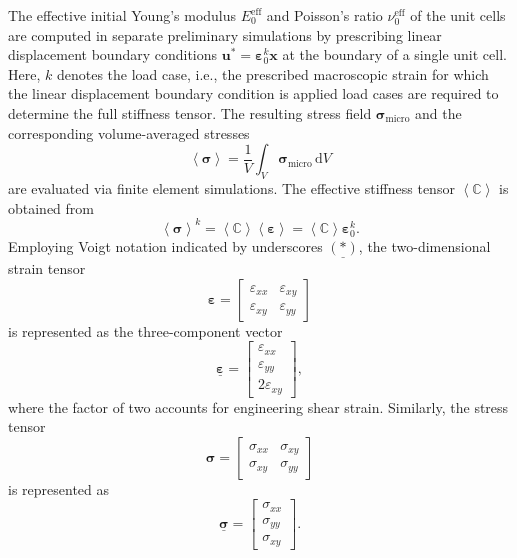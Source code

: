 \documentclass[pdflatex,sn-mathphys-num]{sn-jnl}%
\theoremstyle{thmstyleone}%
\theoremstyle{thmstyletwo}%
\theoremstyle{thmstylethree}%
\begin{document}
The effective initial Young’s modulus $E_0^{\text{eff}}$ and Poisson’s ratio $\nu_0^{\text{eff}}$ of the unit cells are computed in separate preliminary simulations by prescribing linear displacement boundary conditions $\boldsymbol{u}^* = \boldsymbol{\varepsilon}_0^k \boldsymbol{x}$ at the boundary of a single unit cell.
Here, $k$ denotes the load case, i.e., the prescribed macroscopic strain for which the linear displacement boundary condition is applied load cases are required to determine the full stiffness tensor.
The resulting stress field $\boldsymbol{\sigma}_{\text{micro}}$ and the corresponding volume-averaged stresses
\begin{equation}
    \left< \boldsymbol{\sigma} \right> = \dfrac{1}{V} \int_V \boldsymbol{\sigma}_{\text{micro}} \, \mathrm{d}V
\end{equation}
are evaluated via finite element simulations. The effective stiffness tensor $\left< \boldsymbol{\mathbb{C}} \right>$ is obtained from
\begin{equation}
    \left< \boldsymbol{\sigma} \right>^k = \left< \boldsymbol{\mathbb{C}} \right>  \left< \boldsymbol{\varepsilon} \right> = \left< \boldsymbol{\mathbb{C}} \right>  \boldsymbol{\varepsilon}_0^k.
\end{equation}
Employing Voigt notation indicated by underscores $\underline{(*)}$, the two-dimensional strain tensor
\[
\boldsymbol{\varepsilon} = 
\begin{bmatrix} \varepsilon_{xx} & \varepsilon_{xy} \\ \varepsilon_{xy} & \varepsilon_{yy} \end{bmatrix}
\]
is represented as the three-component vector
\begin{equation}
\underline{\boldsymbol{\varepsilon}} = 
\begin{bmatrix} \varepsilon_{xx} \\ \varepsilon_{yy} \\ 2 \varepsilon_{xy} \end{bmatrix},
\end{equation}
where the factor of two accounts for engineering shear strain. Similarly, the stress tensor
\[
\boldsymbol{\sigma} = 
\begin{bmatrix} \sigma_{xx} & \sigma_{xy} \\ \sigma_{xy} & \sigma_{yy} \end{bmatrix}
\]
is represented as
\begin{equation}
\underline{\boldsymbol{\sigma}} = 
\begin{bmatrix} \sigma_{xx} \\ \sigma_{yy} \\ \sigma_{xy} \end{bmatrix}.
\end{equation}
\end{document}
